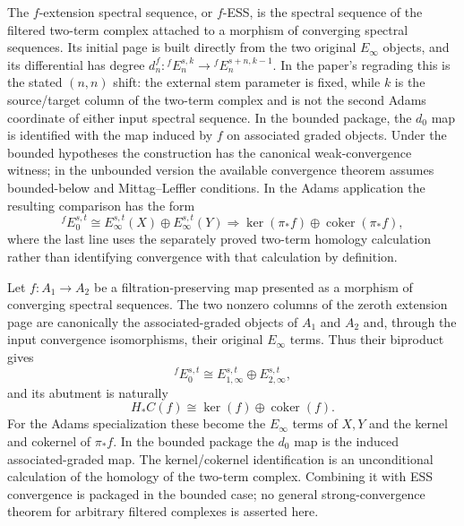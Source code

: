 \begin{definition}
  \label{def:f-extension-ss}
  \notready
  The $f$-extension spectral sequence, or $f$-ESS, is the spectral sequence of
  the filtered two-term complex attached to a morphism of converging spectral
  sequences.  Its initial page is built directly from the two original
  $E_\infty$ objects, and its differential has degree
  $d_n^f:{}^fE_n^{s,k}\to{}^fE_n^{s+n,k-1}$.  In the paper's regrading this is
  the stated $(n,n)$ shift: the external stem parameter is fixed, while $k$
  is the source/target column of the two-term complex and is not the second
  Adams coordinate of either input spectral sequence.  In the bounded
  package, the $d_0$ map is identified with the map induced by $f$ on
  associated graded objects.  Under the bounded hypotheses the construction has the
  canonical weak-convergence witness; in the unbounded version the available
  convergence theorem assumes bounded-below and Mittag--Leffler conditions.
  In the Adams application the resulting comparison has the form
  \[
    {}^fE_0^{s,t}\cong E_\infty^{s,t}(X)\oplus
      E_\infty^{s,t}(Y)
    \Longrightarrow
    \ker(\pi_*f)\oplus\operatorname{coker}(\pi_*f),
  \]
  where the last line uses the separately proved two-term homology
  calculation rather than identifying convergence with that calculation by
  definition.
\end{definition}

\begin{theorem}
  \label{thm:fess-e0-abutment-comparison}
  \notready
  Let $f:A_1\to A_2$ be a filtration-preserving map presented as a morphism
  of converging spectral sequences.  The two nonzero columns of the zeroth
  extension page are canonically the associated-graded objects of $A_1$ and
  $A_2$ and, through the input convergence isomorphisms, their original
  $E_\infty$ terms.  Thus their biproduct gives
  \[
    {}^fE_0^{s,t}\cong E_{1,\infty}^{s,t}\oplus E_{2,\infty}^{s,t},
  \]
  and its abutment is naturally
  \[
    H_*C(f)\cong\ker(f)\oplus\operatorname{coker}(f).
  \]
  For the Adams specialization these become the $E_\infty$ terms of $X,Y$
  and the kernel and cokernel of $\pi_*f$.  In the bounded package the $d_0$
  map is the induced associated-graded map.  The kernel/cokernel identification
  is an unconditional calculation of the homology of the two-term complex.
  Combining it with ESS convergence is packaged in the bounded case; no
  general strong-convergence theorem for arbitrary filtered complexes is
  asserted here.
\end{theorem}

